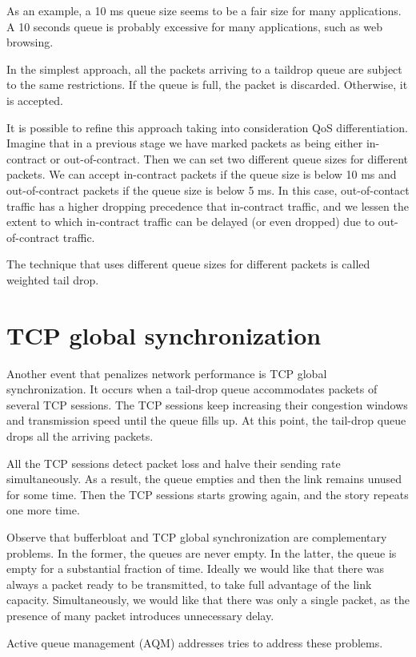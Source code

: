 As an example, a 10 ms queue size seems to be a fair size for many applications.
A 10 seconds queue is probably excessive for many applications, such as web browsing.

In the simplest approach, all the packets arriving to a taildrop queue are subject to the same restrictions.
If the queue is full, the packet is discarded.
Otherwise, it is accepted.

It is possible to refine this approach taking into consideration QoS differentiation.
Imagine that in a previous stage we have marked packets as being either in-contract or out-of-contract.
Then we can set two different queue sizes for different packets.
We can accept in-contract packets if the queue size is below 10 ms and out-of-contract packets if the queue size is below 5 ms.
In this case, out-of-contact traffic has a higher dropping precedence that in-contract traffic, and we lessen the extent to which in-contract traffic can be delayed (or even dropped) due to out-of-contract traffic.

The technique that uses different queue sizes for different packets is called weighted tail drop.

\section{TCP global synchronization}

Another event that penalizes network performance is TCP global synchronization.
It occurs when a tail-drop queue accommodates packets of several TCP sessions.
The TCP sessions keep increasing their congestion windows and transmission speed until the queue fills up.
At this point, the tail-drop queue drops all the arriving packets.

All the TCP sessions detect packet loss and halve their sending rate simultaneously.
As a result, the queue empties and then the link remains unused for some time.
Then the TCP sessions starts growing again, and the story repeats one more time.

Observe that bufferbloat and TCP global synchronization are complementary problems.
In the former, the queues are never empty.
In the latter, the queue is empty for a substantial fraction of time.
Ideally we would like that there was always a packet ready to be transmitted, to take full advantage of the link capacity.
Simultaneously, we would like that there was only a single packet, as the presence of many packet introduces unnecessary delay.

Active queue management (AQM) addresses tries to address these problems.

